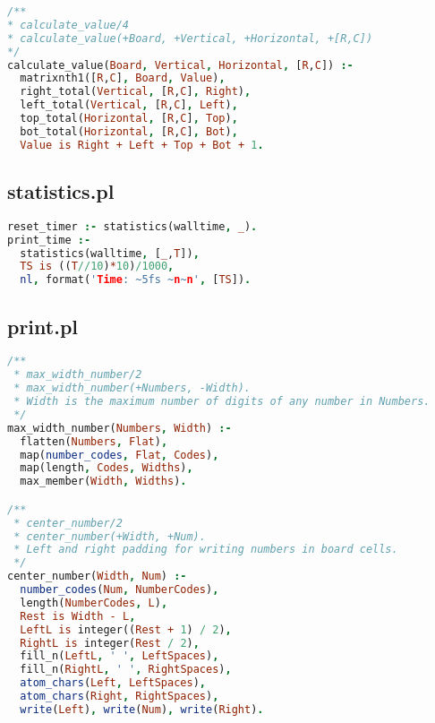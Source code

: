 \documentclass[runningheads]{llncs}
\begin{document}
\begin{center}
\begin{minipage}{0.85\textwidth}
\centering\ttfamily
\begin{lstlisting}[language=Prolog]
/**
* calculate_value/4
* calculate_value(+Board, +Vertical, +Horizontal, +[R,C])
*/
calculate_value(Board, Vertical, Horizontal, [R,C]) :-
  matrixnth1([R,C], Board, Value),
  right_total(Vertical, [R,C], Right),
  left_total(Vertical, [R,C], Left),
  top_total(Horizontal, [R,C], Top),
  bot_total(Horizontal, [R,C], Bot),
  Value is Right + Left + Top + Bot + 1.


\end{lstlisting}
\end{minipage}
\end{center}

\subsection{statistics.pl}

\begin{center}
\begin{minipage}{0.85\textwidth}
\centering\ttfamily
\begin{lstlisting}[language=Prolog]
reset_timer :- statistics(walltime, _).
print_time :-
  statistics(walltime, [_,T]),
  TS is ((T//10)*10)/1000,
  nl, format('Time: ~5fs ~n~n', [TS]).

\end{lstlisting}
\end{minipage}
\end{center}

\subsection{print.pl}

\begin{center}
\begin{minipage}{0.85\textwidth}
\centering\ttfamily
\begin{lstlisting}[language=Prolog]
/**
 * max_width_number/2
 * max_width_number(+Numbers, -Width).
 * Width is the maximum number of digits of any number in Numbers.
 */
max_width_number(Numbers, Width) :-
  flatten(Numbers, Flat),
  map(number_codes, Flat, Codes),
  map(length, Codes, Widths),
  max_member(Width, Widths).

/**
 * center_number/2
 * center_number(+Width, +Num).
 * Left and right padding for writing numbers in board cells.
 */
center_number(Width, Num) :-
  number_codes(Num, NumberCodes),
  length(NumberCodes, L),
  Rest is Width - L,
  LeftL is integer((Rest + 1) / 2),
  RightL is integer(Rest / 2),
  fill_n(LeftL, ' ', LeftSpaces),
  fill_n(RightL, ' ', RightSpaces),
  atom_chars(Left, LeftSpaces),
  atom_chars(Right, RightSpaces),
  write(Left), write(Num), write(Right).
\end{lstlisting}
\end{minipage}
\end{center}
  
\end{document}
